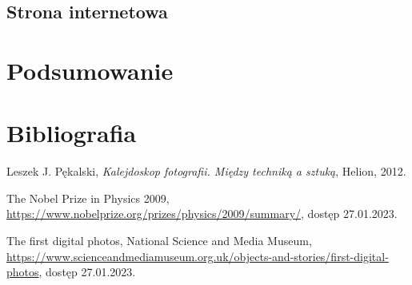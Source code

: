 \documentclass[12pt]{article}
\numberwithin{figure}{section}
\begin{document}
\begin{sloppypar}

\subsection{Strona internetowa}


\newpage 

\section{Podsumowanie}


\newpage 

%
    \listoffigures
    \clearpage


\newpage 

%
    \listoftables
    \clearpage


\newpage 

%
    \listofcodes
    \clearpage


\newpage 

\section*{Bibliografia}
    \renewcommand{\section}[2]{}
    
\begin{thebibliography}{99}

    Leszek J. Pękalski,
    \textit{Kalejdoskop fotografii. Między techniką a sztuką},
    Helion,
    2012.

    The Nobel Prize in Physics 2009,
    \url{https://www.nobelprize.org/prizes/physics/2009/summary/}, 
    dostęp 27.01.2023.

    The first digital photos, National Science and Media Museum,
    \url{https://www.scienceandmediamuseum.org.uk/objects-and-stories/first-digital-photos},
    dostęp 27.01.2023.


\end{thebibliography}
\end{sloppypar}
\end{document}
